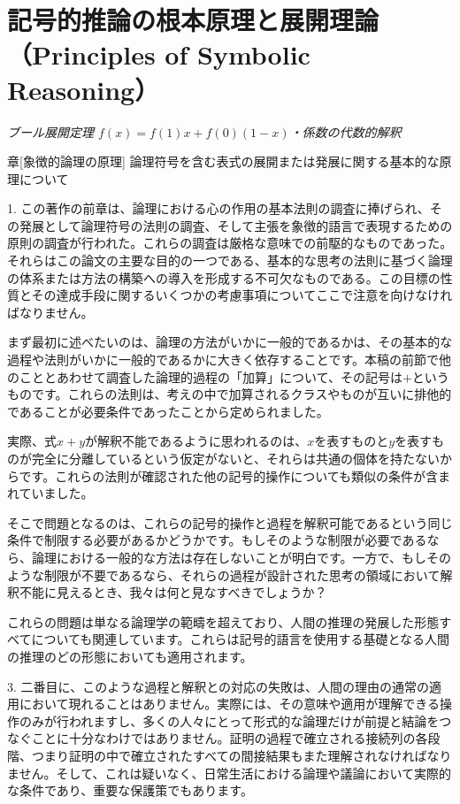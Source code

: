 \documentclass[a4paper,11pt,openany]{ltjsbook}
\begin{document}
\newpage

\chapter{記号的推論の根本原理と展開理論（Principles of Symbolic Reasoning）}
\label{ch:v}

\begin{center}
\large\textit{ブール展開定理 $f(x) = f(1)x + f(0)(1-x)$・係数の代数的解釈}
\end{center}
\vspace{4mm}

章[象徴的論理の原理]
{\large 論理符号を含む表式の展開または発展に関する基本的な原理について}

1. この著作の前章は、論理における心の作用の基本法則の調査に捧げられ、その発展として論理符号の法則の調査、そして主張を象徴的語言で表現するための原則の調査が行われた。これらの調査は厳格な意味での前駆的なものであった。それらはこの論文の主要な目的の一つである、基本的な思考の法則に基づく論理の体系または方法の構築への導入を形成する不可欠なものである。この目標の性質とその達成手段に関するいくつかの考慮事項についてここで注意を向けなければなりません。

まず最初に述べたいのは、論理の方法がいかに一般的であるかは、その基本的な過程や法則がいかに一般的であるかに大きく依存することです。本稿の前節で他のこととあわせて調査した論理的過程の「加算」について、その記号は$+$というものです。これらの法則は、考えの中で加算されるクラスやものが互いに排他的であることが必要条件であったことから定められました。

実際、式$x + y$が解釈不能であるように思われるのは、$x$を表すものと$y$を表すものが完全に分離しているという仮定がないと、それらは共通の個体を持たないからです。これらの法則が確認された他の記号的操作についても類似の条件が含まれていました。

そこで問題となるのは、これらの記号的操作と過程を解釈可能であるという同じ条件で制限する必要があるかどうかです。もしそのような制限が必要であるなら、論理における一般的な方法は存在しないことが明白です。一方で、もしそのような制限が不要であるなら、それらの過程が設計された思考の領域において解釈不能に見えるとき、我々は何と見なすべきでしょうか？

これらの問題は単なる論理学の範疇を超えており、人間の推理の発展した形態すべてについても関連しています。これらは記号的語言を使用する基礎となる人間の推理のどの形態においても適用されます。

3. 二番目に、このような過程と解釈との対応の失敗は、人間の理由の通常の適用において現れることはありません。実際には、その意味や適用が理解できる操作のみが行われますし、多くの人々にとって形式的な論理だけが前提と結論をつなぐことに十分なわけではありません。証明の過程で確立される接続列の各段階、つまり証明の中で確立されたすべての間接結果もまた理解されなければなりません。そして、これは疑いなく、日常生活における論理や議論において実際的な条件であり、重要な保護策でもあります。
\end{document}

